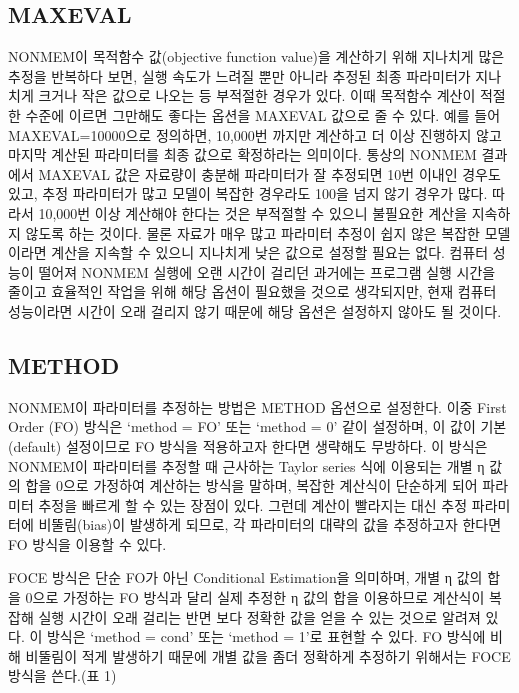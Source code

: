 \documentclass[
  10pt,
]{krantz}
\begin{document}
\hypertarget{maxeval}{%
\subsection{MAXEVAL}\label{maxeval}}

NONMEM이 목적함수 값(objective function value)을 계산하기 위해 지나치게 많은 추정을 반복하다 보면,
실행 속도가 느려질 뿐만 아니라 추정된 최종 파라미터가 지나치게 크거나 작은 값으로 나오는 등 부적절한 경우가 있다. 이때
목적함수 계산이 적절한 수준에 이르면 그만해도 좋다는 옵션을 MAXEVAL 값으로 줄 수 있다. 예를 들어
MAXEVAL=10000으로 정의하면, 10,000번 까지만 계산하고 더 이상 진행하지 않고 마지막 계산된 파라미터를 최종 값으로
확정하라는 의미이다. 통상의 NONMEM 결과에서 MAXEVAL 값은 자료량이 충분해 파라미터가 잘 추정되면 10번 이내인 경우도
있고, 추정 파라미터가 많고 모델이 복잡한 경우라도 100을 넘지 않기 경우가 많다. 따라서 10,000번 이상 계산해야 한다는
것은 부적절할 수 있으니 불필요한 계산을 지속하지 않도록 하는 것이다. 물론 자료가 매우 많고 파라미터 추정이 쉽지 않은
복잡한 모델이라면 계산을 지속할 수 있으니 지나치게 낮은 값으로 설정할 필요는 없다. 컴퓨터 성능이 떨어져 NONMEM
실행에 오랜 시간이 걸리던 과거에는 프로그램 실행 시간을 줄이고 효율적인 작업을 위해 해당 옵션이 필요했을 것으로 생각되지만,
현재 컴퓨터 성능이라면 시간이 오래 걸리지 않기 때문에 해당 옵션은 설정하지 않아도 될 것이다.

\hypertarget{method}{%
\subsection{METHOD}\label{method}}

NONMEM이 파라미터를 추정하는 방법은 METHOD 옵션으로 설정한다. 이중 First Order (FO) 방식은 `method
= FO' 또는 `method = 0' 같이 설정하며, 이 값이 기본(default) 설정이므로 FO 방식을 적용하고자 한다면
생략해도 무방하다. 이 방식은 NONMEM이 파라미터를 추정할 때 근사하는 Taylor series 식에 이용되는 개별 η
값의 합을 0으로 가정하여 계산하는 방식을 말하며, 복잡한 계산식이 단순하게 되어 파라미터 추정을 빠르게 할 수 있는 장점이
있다. 그런데 계산이 빨라지는 대신 추정 파라미터에 비뚤림(bias)이 발생하게 되므로, 각 파라미터의 대략의 값을
추정하고자 한다면 FO 방식을 이용할 수 있다.

FOCE 방식은 단순 FO가 아닌 Conditional Estimation을 의미하며, 개별 η 값의 합을 0으로 가정하는 FO
방식과 달리 실제 추정한 η 값의 합을 이용하므로 계산식이 복잡해 실행 시간이 오래 걸리는 반면 보다 정확한 값을 얻을 수
있는 것으로 알려져 있다. 이 방식은 `method = cond' 또는 `method = 1'로 표현할 수 있다. FO
방식에 비해 비뚤림이 적게 발생하기 때문에 개별 값을 좀더 정확하게 추정하기 위해서는 FOCE 방식을 쓴다.(표 1)
\end{document}
